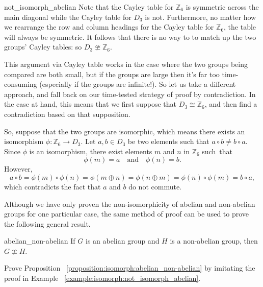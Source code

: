 \begin{example}{not_isomorph_abelian}
Note that the Cayley table for ${\mathbb Z}_6$ is symmetric across the main diagonal while the Cayley table for $D_3$ is not.  Furthermore, no matter how we rearrange the row and column headings for the Cayley table for ${\mathbb Z}_6$, the  table will always be symmetric. It follows that there is no way to to match up the two groups' Cayley tables: so $D_3 \ncong {\mathbb Z}_6$.

This  argument via Cayley table works in the case where the two groups being compared are both small, but if the groups are large then it's far too time-consuming (especially if the groups are infinite!). So let us take a different approach, and fall back on our time-tested strategy of proof by contradiction. In the case at hand, this means that we first suppose that $D_3 \cong {\mathbb Z}_6$, and  then find a contradiction based on that supposition. 

So, suppose that the two groups are isomorphic, which means there exists an isomorphism $\phi : {\mathbb Z}_6 \rightarrow  D_3$.  Let $a , b \in D_3$ be two elements such that $a\circ b \neq b \circ a$.  Since $\phi$ is an isomorphism, there exist elements $m$ and $n$ in ${\mathbb Z}_6$ such~that 
\[
\phi( m )  = a \quad \text{and} \quad
\phi( n )  = b.
\]
However,
\[
a\circ b = \phi(m ) \circ  \phi(n) = \phi(m \oplus  n) = \phi(n \oplus m) = \phi(n ) \circ \phi(m) = b \circ a,
\]
which contradicts the fact that $a$ and $b$ do not commute.
\end{example}

Although we have only proven the non-isomorphicity of abelian and non-abelian groups for one particular case, the same  method of proof can be used to prove the following general result.

\begin{prop}{abelian_non-abelian}
If $G$ is an abelian group and $H$ is a non-abelian group, then $G \ncong H$.
\end{prop}

\begin{exercise}{}
Prove Proposition ~\ref{proposition:isomorph:abelian_non-abelian} by imitating the proof in Example ~\ref{example:isomorph:not_isomorph_abelian}.
\end{exercise}

